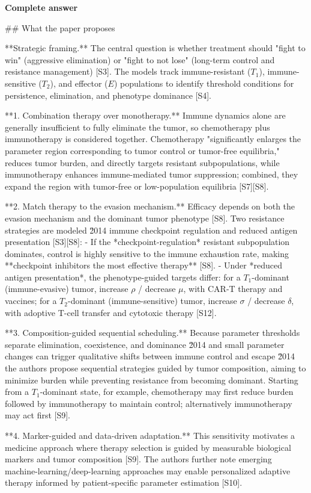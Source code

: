 \documentclass[10pt]{article}
\begin{document}
\textbf{Complete answer}
\begin{AnswerText}
## What the paper proposes

**Strategic framing.** The central question is whether treatment should "fight to win" (aggressive elimination) or "fight to not lose" (long-term control and resistance management) [S3]. The models track immune-resistant ($T_1$), immune-sensitive ($T_2$), and effector ($E$) populations to identify threshold conditions for persistence, elimination, and phenotype dominance [S4].

**1. Combination therapy over monotherapy.** Immune dynamics alone are generally insufficient to fully eliminate the tumor, so chemotherapy plus immunotherapy is considered together. Chemotherapy "significantly enlarges the parameter region corresponding to tumor control or tumor-free equilibria," reduces tumor burden, and directly targets resistant subpopulations, while immunotherapy enhances immune-mediated tumor suppression; combined, they expand the region with tumor-free or low-population equilibria [S7][S8].

**2. Match therapy to the evasion mechanism.** Efficacy depends on both the evasion mechanism and the dominant tumor phenotype [S8]. Two resistance strategies are modeled \u2014 immune checkpoint regulation and reduced antigen presentation [S3][S8]:
- If the *checkpoint-regulation* resistant subpopulation dominates, control is highly sensitive to the immune exhaustion rate, making **checkpoint inhibitors the most effective therapy** [S8].
- Under *reduced antigen presentation*, the phenotype-guided targets differ: for a $T_1$-dominant (immune-evasive) tumor, increase $\rho$ / decrease $\mu$, with CAR-T therapy and vaccines; for a $T_2$-dominant (immune-sensitive) tumor, increase $\sigma$ / decrease $\delta$, with adoptive T-cell transfer and cytotoxic therapy [S12].

**3. Composition-guided sequential scheduling.** Because parameter thresholds separate elimination, coexistence, and dominance \u2014 and small parameter changes can trigger qualitative shifts between immune control and escape \u2014 the authors propose sequential strategies guided by tumor composition, aiming to minimize burden while preventing resistance from becoming dominant. Starting from a $T_1$-dominant state, for example, chemotherapy may first reduce burden followed by immunotherapy to maintain control; alternatively immunotherapy may act first [S9].

**4. Marker-guided and data-driven adaptation.** This sensitivity motivates a medicine approach where therapy selection is guided by measurable biological markers and tumor composition [S9]. The authors further note emerging machine-learning/deep-learning approaches may enable personalized adaptive therapy informed by patient-specific parameter estimation [S10].


\end{AnswerText}
\end{document}
